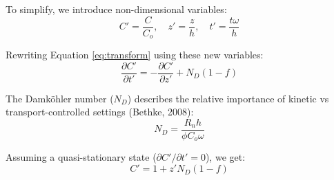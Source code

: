 \begin{tcolorbox}
{\begin{multicols}{2}

To simplify, we introduce non-dimensional variables:
\vspace{10mm}
\columnbreak %
\begin{equation}
    C' = \frac{C}{C_o},\quad z' = \frac{z}{h},\quad t' = \frac{t\omega}{h}
    \label{eq:transform}
\end{equation}
    
\end{multicols}

\bsk

\begin{multicols}{2}%
    
    Rewriting Equation \ref{eq:transform} using these new variables:
    \vspace{10mm}
    \columnbreak %
    \begin{equation}
        \frac{\partial C'}{\partial t'} = -\frac{\partial C'}{\partial z'} + N_D(1-f)
    \end{equation}
    
\end{multicols}

\bsk

\begin{multicols}{2} %
    
    The Damköhler number (\(N_D\)) describes the relative importance of kinetic vs transport-controlled settings (Bethke, 2008):
    \vspace{10mm}
    \columnbreak
    \begin{equation}
        N_D = \frac{R_n h}{\phi C_o \omega}
    \end{equation}
    
\end{multicols}

\bsk

\begin{multicols}{2} %
    
    Assuming a quasi-stationary state (\(\partial C'/\partial t' = 0\)), we get:
    \vspace{10mm}
    \columnbreak %
    \begin{equation}
        C' = 1 + z'N_D(1-f)
    \end{equation}
    

\end{multicols}}
\end{tcolorbox}
